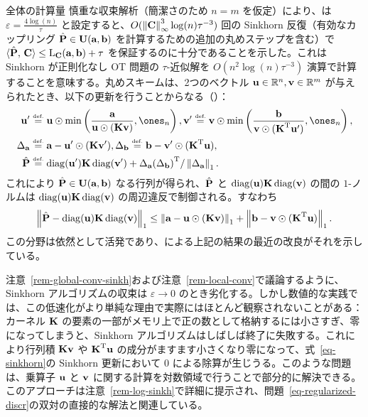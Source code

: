 \begin{rem1}{全体の計算量}\label{rem-complexity-rounding}
	慎重な収束解析（簡潔さのため $n=m$ を仮定）により、\citet{altschuler2017near}は $\varepsilon = \frac{4\log(n)}{\tau}$ と設定すると、$O(\norm{\C}_\infty^3 \log(n) \tau^{-3})$ 回の Sinkhorn 反復（有効なカップリング $\hat \P \in \CouplingsD(\a,\b)$ を計算するための追加の丸めステップを含む）で $\dotp{\hat \P}{\C} \leq \MKD_{\C}(\a,\b) + \tau$ を保証するのに十分であることを示した。これは Sinkhorn が正則化なし OT 問題の $\tau$-近似解を $O(n^2\log(n) \tau^{-3})$ 演算で計算することを意味する。丸めスキームは、2つのベクトル $\uD\in\RR^n,\vD\in\RR^m$ が与えられたとき、以下の更新を行うことからなる（\cite[Alg. 2]{altschuler2017near}）：
	$$\begin{aligned}
		\uD'& \eqdef \uD\odot\min\left(\frac{\a}{\uD\odot(\K\vD)},\ones_n\right),
		\vD' \eqdef \vD\odot \min\left(\frac{\b}{\vD\odot(\transp{\K}\uD')},\ones_n\right), \\
	\Delta_{\a}& \eqdef \a- \uD'\odot (\K \vD'), \Delta_{\b} \eqdef \b- \vD'\odot (\transp{\K} \uD), \\
	\hat\P& \eqdef \diag(\uD')\K\diag(\vD')+\Delta_{\a} \transp{(\Delta_{\b})}/\norm{\Delta_{\a}}_1.
	\end{aligned}$$
	これにより $\hat\P \in \CouplingsD(\a,\b)$ なる行列が得られ、$\hat\P$ と $\diag(\uD)\K\diag(\vD)$ の間の $1$-ノルムは $\diag(\uD)\K\diag(\vD)$ の周辺違反で制御される。すなわち
	$$ \norm{\hat\P-\diag(\uD)\K\diag(\vD)}_1 \leq \norm{\a-\uD\odot(\K\vD)}_1+\norm{\b-\vD\odot(\transp{\K}\uD)}_1.$$
この分野は依然として活発であり、\citet{pmlr-v80-dvurechensky18a}による上記の結果の最近の改良がそれを示している。
\end{rem1}

\begin{rem}\label{rem-stability}
注意~\ref{rem-global-conv-sinkh}および注意~\ref{rem-local-conv}で議論するように、Sinkhorn アルゴリズムの収束は $\varepsilon\rightarrow 0$ のとき劣化する。しかし数値的な実践では、この低速化がより単純な理由で実際にはほとんど観察されないことがある：カーネル $\K$ の要素の一部がメモリ上で正の数として格納するには小さすぎ、零になってしまうと、Sinkhorn アルゴリズムはしばしば終了に失敗する。これにより行列積 $\K\vD$ や $\transp{\K}\uD$ の成分がますます小さくなり零になって、式~\eqref{eq-sinkhorn}の Sinkhorn 更新において $0$ による除算が生じうる。このような問題は、乗算子 $\uD$ と $\vD$ に関する計算を対数領域で行うことで部分的に解決できる。このアプローチは注意~\ref{rem-log-sinkh}で詳細に提示され、問題~\eqref{eq-regularized-discr}の双対の直接的な解法と関連している。
\end{rem}

